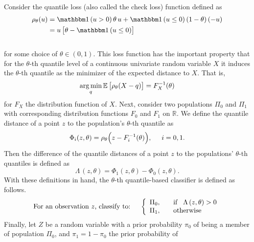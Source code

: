 Consider the quantile loss (also called the check loss) function defined as
\begin{align}
  \label{eq:check-loss}
  \begin{split}
    \rho_\theta(u)
    &= \ind(u > 0)\, \theta\, u  + \ind (u \leq 0)\, (1 - \theta)\, (-u)  \\[0ex]
    &= u\, \big[ \theta - \ind(u \leq 0) \big]
  \end{split}
\end{align}
\\[-1ex]
for some choice of $\theta \in (0,1)$.  This loss function has the important
property that for the $\theta$-th quantile level of a continuous univariate
random variable $X$ it induces the $\theta$-th quantile as the minimizer of the
expected distance to $X$.  That is,
\begin{equation}
  \label{eq:check-loss-min}
  \operatorname*{arg\,min}_q \mathbb{E}\, \big[ \rho_\theta (X - q) \big] = F_X^{-1}(\theta)
\end{equation}
for $F_X$ the distribution function of $X$.  Next, consider two populations
$\Pi_0$ and $\Pi_1$ with corresponding distribution functions $F_0$ and $F_1$ on
$\mathbb{R}$.  We define the quantile distance of a point $z$ to the
population's $\theta$-th quantile as
\begin{equation}
  \label{eq:phi}
  \Phi_i(z, \theta) = \rho_{\theta}\Big(z - F_i^{-1}(\theta)\Big),
  \hspace{5mm} i = 0, 1.
\end{equation}
Then the difference of the quantile distances of a point $z$ to the populations'
$\theta$-th quantiles is defined as
\begin{equation}
  \Lambda\,(z, \theta) = \Phi_1(z, \theta) - \Phi_0(z, \theta).
\end{equation}
With these definitions in hand, the $\theta$-th quantile-based classifier is
defined as follows.
\begin{equation}
  \label{eq:quantile-classifier}
  \text{For an observation $z$, classify to:} \hspace{5mm} \left\{ 
    \begin{array}{lcl}
      \Pi_0, & & \text{if} \hspace{3mm}\Lambda\,(z, \theta) > 0 \\[0ex]
      \Pi_1, & & \text{otherwise}
    \end{array}
  \right.
\end{equation}
Finally, let $Z$ be a random variable with a prior probability $\pi_0$ of being
a member of population $\Pi_0$, and $\pi_1 = 1 - \pi_0$ the prior probability of
